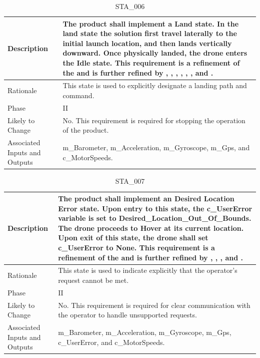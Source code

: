 \documentclass{article}
\begin{document}
\begin{table}[!h]
\begin{center}
\caption {STA\_006} 
\label{STA_006}
\begin{tabular}{ | m{3cm} | m{11cm} | }
\hline
Description & The product shall implement a Land state. In the land state the solution first travel laterally to the initial launch location, and then lands vertically downward. Once physically landed, the drone enters the Idle state. This requirement is a refinement of the \nameref{Land State} and is further refined by \nameref{PERF_002}, \nameref{PERF_004}, \nameref{PERF_006}, \nameref{PERF_007}, \nameref{SAFE_001}, \nameref{SAFE_003}, and \nameref{USE_003}. \\
\hline
Rationale & This state is used to explicitly designate a landing path and command. \\
\hline
Phase & II \\
\hline
Likely to Change & No. This requirement is required for stopping the operation of the product. \\
\hline
Associated Inputs and Outputs & m\_Barometer, m\_Acceleration, m\_Gyroscope, m\_Gps, and c\_MotorSpeeds. \\
\hline
\end{tabular}
\end{center}
\end{table}

\begin{table}[!h]
\begin{center}
\caption {STA\_007} 
\label{STA_007}
\begin{tabular}{ | m{3cm} | m{11cm} | }
\hline
Description & The product shall implement an Desired Location Error state. Upon entry to this state, the c\_UserError variable is set to Desired_Location_Out_Of_Bounds. The drone proceeds to Hover at its current location. Upon exit of this state, the drone shall set c\_UserError to None. This requirement is a refinement of the \nameref{Desired Location Error State} and is further refined by \nameref{PERF_007}, \nameref{SAFE_001}, \nameref{SAFE_003}, and \nameref{USE_003}. \\
\hline
Rationale & This state is used to indicate explicitly that the operator's request cannot be met.  \\
\hline
Phase & II \\
\hline
Likely to Change & No. This requirement is required for clear communication with the operator to handle unsupported requests. \\
\hline
Associated Inputs and Outputs & m\_Barometer, m\_Acceleration, m\_Gyroscope, m\_Gps, c\_UserError, and c\_MotorSpeeds. \\
\hline
\end{tabular}
\end{center}
\end{table}
\end{document}
